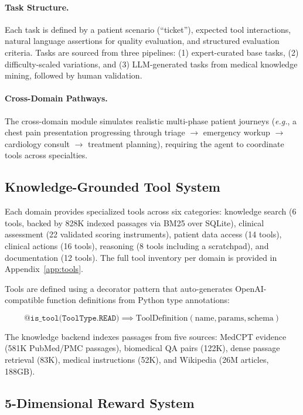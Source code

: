 \documentclass{article}
\newcommand{\eg}{\textit{e.g.}}
\begin{document}
\paragraph{Task Structure.}
Each task is defined by a patient scenario (``ticket''), expected tool interactions, natural language assertions for quality evaluation, and structured evaluation criteria. Tasks are sourced from three pipelines: (1) expert-curated base tasks, (2) difficulty-scaled variations, and (3) LLM-generated tasks from medical knowledge mining, followed by human validation.

\paragraph{Cross-Domain Pathways.}
The cross-domain module simulates realistic multi-phase patient journeys (\eg{}, a chest pain presentation progressing through triage $\to$ emergency workup $\to$ cardiology consult $\to$ treatment planning), requiring the agent to coordinate tools across specialties.


\subsection{Knowledge-Grounded Tool System}
\label{sec:tools}

Each domain provides specialized tools across six categories: knowledge search (6 tools, backed by 828K indexed passages via BM25 over SQLite), clinical assessment (22 validated scoring instruments), patient data access (14 tools), clinical actions (16 tools), reasoning (8 tools including a scratchpad), and documentation (12 tools). The full tool inventory per domain is provided in Appendix~\ref{app:tools}.

Tools are defined using a decorator pattern that auto-generates OpenAI-compatible function definitions from Python type annotations:

\begin{equation}
    \texttt{@is\_tool(ToolType.READ)} \implies \text{ToolDefinition}(\text{name}, \text{params}, \text{schema})
\end{equation}

The knowledge backend indexes passages from five sources: MedCPT evidence (581K PubMed/PMC passages), biomedical QA pairs (122K), dense passage retrieval (83K), medical instructions (52K), and Wikipedia (26M articles, 188GB).


\subsection{5-Dimensional Reward System}
\label{sec:reward}
\end{document}
